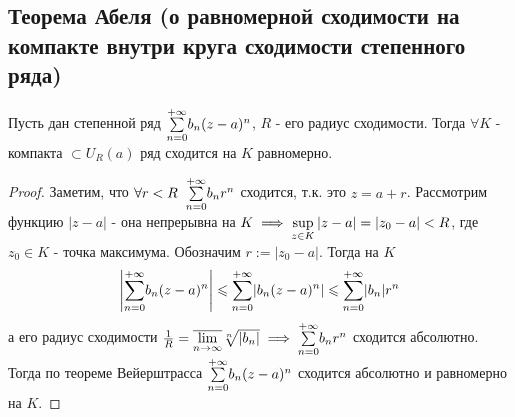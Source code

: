 \subsection{Теорема Абеля (о равномерной сходимости на компакте внутри круга сходимости степенного
ряда)}
\begin{theorem}
  Пусть дан степенной ряд $\Sum{n=0}{+\infty}b_n(z-a)^n$, $R$ - его радиус сходимости. Тогда $\forall K$ - компакта $\subset U_R(a)$ ряд сходится на $K$ равномерно.
\end{theorem}
\begin{proof}
  Заметим, что $\forall r<R\q \Sum{n=0}{+\infty}b_nr^n$ сходится, т.к. это $z=a+r$. Рассмотрим функцию $|z-a|$ - она непрерывна на $K\implies \Sup{z\in K}|z-a|=|z_0-a|<R$, где $z_0\in K$ - точка максимума. Обозначим $r:=|z_0-a|$. Тогда на $K$ 
  \[\left|\Sum{n=0}{+\infty}b_n(z-a)^n\right|\leqslant \Sum{n=0}{+\infty}|b_n(z-a)^n|\leqslant \Sum{n=0}{+\infty}|b_n|r^n\]
  а его радиус сходимости $\frac{1}{R}=\uplim{n}{\infty}\sqrt[n]{|b_n|}\implies \Sum{n=0}{+\infty}b_nr^n$ сходится абсолютно. Тогда по теореме Вейерштрасса $\Sum{n=0}{+\infty}b_n(z-a)^n$ сходится абсолютно и равномерно на $K$. 
\end{proof}
